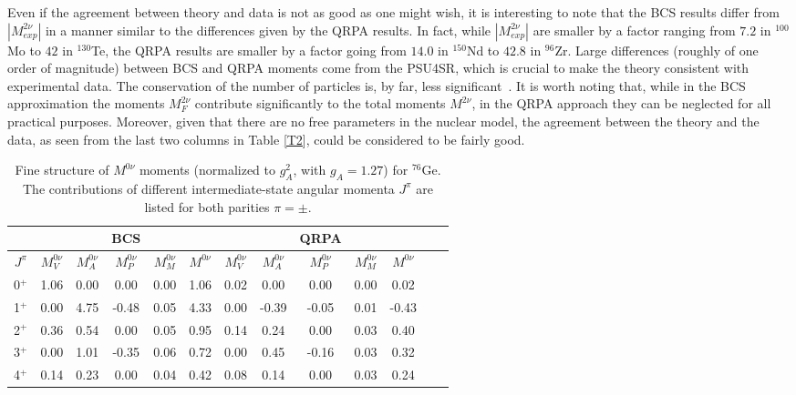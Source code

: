 \documentclass[nofootinbib,twocolumn,eqsecnum,floats,aps]{revtex4}
\def\sss{\scriptscriptstyle}
\def\sss{\scriptscriptstyle}
\begin{document}
{%
 Even if the agreement between theory and data
is not as good as one might wish, it is interesting to note that the BCS results differ
from $|M^{2\nu}_{exp}|$ in a manner similar to the differences given by the QRPA results.
 In fact, while  $|M^{2\nu}_{exp}|$ are smaller by a factor ranging from $7.2$
in $^{100}$Mo to $42$ in $^{130}$Te, the QRPA  results are
smaller by a factor going from $14.0$ in $^{150}$Nd to $42.8$ in $^{96}$Zr.
Large differences (roughly of one order of magnitude) between BCS and QRPA moments
come from the PSU4SR, %
which is crucial
to make the theory consistent with  experimental data.
The conservation  of the number of particles is, by far,
less significant~\cite{Krm93a}.
It is worth noting that, while in the BCS approximation
the  moments $M^{2\nu}_F$ contribute significantly to the total moments $M^{2\nu}$,
in the QRPA approach they can be neglected for all practical purposes.
Moreover, given that there are no free parameters in the nuclear model,
the agreement between the theory and the data, as seen from the  last two
columns in Table \ref{T2}, could be considered to be fairly good.
\begin{table*}[t]
\caption {Fine structure of $M^{0\nu}$ moments (normalized to $g_{\sss A}^2$, with $g_{\sss A}=1.27$) for $^{76}$Ge.
The contributions of different intermediate-state angular momenta $J^\pi$
are listed for both parities $\pi=\pm$.}
\label{T4}
\bigskip
\begin{tabular}{c|ccccc|ccccccc|}
\hline
&&&BCS&&&&&QRPA&&&\\
\hline
$J^\pi$ & $M^{0\nu}_V$& $M^{0\nu}_A$  &  $M^{0\nu}_P$ &$M^{0\nu}_{M}$ &$M^{0\nu} $
            & $M^{0\nu}_V$& $M^{0\nu}_A$  &  $M^{0\nu}_P$ &$M^{0\nu}_{M}$ &$M^{0\nu}$         \\
\hline
   0$^+ $&     1.06&    0.00&    0.00&    0.00&    1.06     &    0.02&    0.00&    0.00&    0.00&    0.02\\
   1$^+ $&     0.00&    4.75&   -0.48&    0.05&    4.33     &    0.00&   -0.39&   -0.05&    0.01&   -0.43\\
   2$^+ $&     0.36&    0.54&    0.00&    0.05&    0.95     &    0.14&    0.24&    0.00&    0.03&    0.40\\
   3$^+ $&     0.00&    1.01&   -0.35&    0.06&    0.72     &    0.00&    0.45&   -0.16&    0.03&    0.32\\
   4$^+ $&     0.14&    0.23&    0.00&    0.04&    0.42     &    0.08&    0.14&    0.00&    0.03&    0.24\\

\end{tabular}
\end{table*}}
\end{document}
